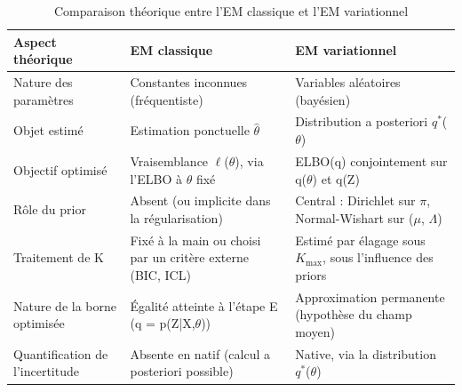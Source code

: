 \begin{table}[H]
\centering
\small
\setlength{\tabcolsep}{0.14cm}
\begin{tabular}{|p{4.84cm}|p{4.84cm}|p{4.84cm}|}
\hline
\textbf{Aspect théorique} & \textbf{EM classique} & \textbf{EM variationnel} \\
\hline
Nature des paramètres & Constantes inconnues (fréquentiste) & Variables aléatoires (bayésien) \\
\hline
Objet estimé & Estimation ponctuelle $\hat{\theta }$ & Distribution a posteriori $q^{*}$($\theta $) \\
\hline
Objectif optimisé & Vraisemblance $\ell $($\theta $), via l'ELBO à $\theta $ fixé & ELBO(q) conjointement sur q($\theta $) et q(Z) \\
\hline
Rôle du prior & Absent (ou implicite dans la régularisation) & Central : Dirichlet sur $\pi $, Normal-Wishart sur ($\mu $, $\Lambda $) \\
\hline
Traitement de K & Fixé à la main ou choisi par un critère externe (BIC, ICL) & Estimé par élagage sous $K_{\max}$, sous l'influence des priors \\
\hline
Nature de la borne optimisée & Égalité atteinte à l'étape E (q = p(Z|X,$\theta $)) & Approximation permanente (hypothèse du champ moyen) \\
\hline
Quantification de l'incertitude & Absente en natif (calcul a posteriori possible) & Native, via la distribution $q^{*}$($\theta $) \\
\hline
\end{tabular}
\caption{Comparaison théorique entre l'EM classique et l'EM variationnel}
\label{tab:2_1}
\end{table}
